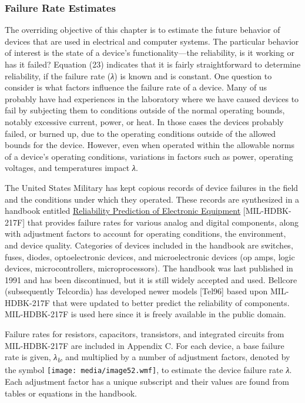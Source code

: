 \subsubsection{Failure Rate Estimates}\label{failure-rate-estimates}

The overriding objective of this chapter is to estimate the future
behavior of devices that are used in electrical and computer systems.
The particular behavior of interest is the state of a device's
functionality---the reliability, is it working or has it failed?
Equation (23) indicates that it is fairly straightforward to determine
reliability, if the failure rate (\emph{λ}) is known and is constant.
One question to consider is what factors influence the failure rate of a
device. Many of us probably have had experiences in the laboratory where
we have caused devices to fail by subjecting them to conditions outside
of the normal operating bounds, notably excessive current, power, or
heat. In those cases the devices probably failed, or burned up, due to
the operating conditions outside of the allowed bounds for the device.
However, even when operated within the allowable norms of a device's
operating conditions, variations in factors such as power, operating
voltages, and temperatures impact \emph{λ}.

The United States Military has kept copious records of device failures
in the field and the conditions under which they operated. These records
are synthesized in a handbook entitled \ul{Reliability Prediction of
Electronic Equipment} {[}MIL-HDBK-217F{]} that provides failure rates
for various analog and digital components, along with adjustment factors
to account for operating conditions, the environment, and device
quality. Categories of devices included in the handbook are switches,
fuses, diodes, optoelectronic devices, and microelectronic devices (op
amps, logic devices, microcontrollers, microprocessors). The handbook
was last published in 1991 and has been discontinued, but it is still
widely accepted and used. Bellcore (subsequently Telcordia) has
developed newer models {[}Tel96{]} based upon MIL-HDBK-217F that were
updated to better predict the reliability of components. MIL-HDBK-217F
is used here since it is freely available in the public domain.

Failure rates for resistors, capacitors, transistors, and integrated
circuits from MIL-HDBK-217F are included in Appendix C. For each device,
a base failure rate is given, \emph{λ\textsubscript{b}}, and multiplied
by a number of adjustment factors, denoted by the symbol
\texttt{[image: media/image52.wmf]}, to estimate the device failure rate
\emph{λ}. Each adjustment factor has a unique subscript and their values
are found from tables or equations in the handbook.

